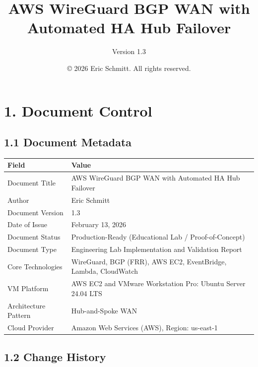 \documentclass[11pt]{article}
\title{AWS WireGuard BGP WAN with Automated HA Hub Failover}
\subtitle{Version 1.3}
\author{© 2026 Eric Schmitt. All rights reserved.}
\begin{document}
\maketitle
\thispagestyle{empty}
\newpage

%
\section{1. Document Control}
\label{sec:document-control}

\subsection{1.1 Document Metadata}
\label{sec:document-metadata}

\begin{tabular}{|l|l|}
\hline
\textbf{Field} & \textbf{Value} \\
\hline
Document Title & AWS WireGuard BGP WAN with Automated HA Hub Failover \\
\hline
Author & Eric Schmitt \\
\hline
Document Version & 1.3 \\
\hline
Date of Issue & February 13, 2026 \\
\hline
Document Status & Production-Ready (Educational Lab / Proof-of-Concept) \\
\hline
Document Type & Engineering Lab Implementation and Validation Report \\
\hline
Core Technologies & WireGuard, BGP (FRR), AWS EC2, EventBridge, Lambda, CloudWatch \\
\hline
VM Platform & AWS EC2 and VMware Workstation Pro: Ubuntu Server 24.04 LTS \\
\hline
Architecture Pattern & Hub-and-Spoke WAN \\
\hline
Cloud Provider & Amazon Web Services (AWS), Region: us-east-1 \\
\hline
\end{tabular}

\subsection{1.2 Change History}
\label{sec:change-history}
\end{document}
